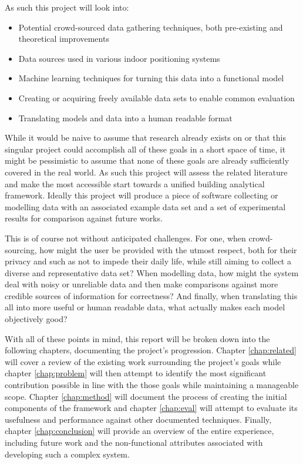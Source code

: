 \documentclass{UoYCSproject}
\begin{document}
        As such this project will look into:
        \begin{itemize}
        	\item Potential crowd-sourced data gathering techniques, both pre-existing and theoretical improvements
        	\item Data sources used in various indoor positioning systems
        	\item Machine learning techniques for turning this data into a functional model
        	\item Creating or acquiring freely available data sets to enable common evaluation
        	\item Translating models and data into a human readable format
        \end{itemize}
        
        While it would be naive to assume that research already exists on or that this singular project could accomplish all of these goals in a short space of time, it might be pessimistic to assume that none of these goals are already sufficiently covered in the real world. As such this project will assess the related literature and make the most accessible start towards a unified building analytical framework. Ideally this project will produce a piece of software collecting or modelling data with an associated example data set and a set of experimental results for comparison against future works.
        
        This is of course not without anticipated challenges. For one, when crowd-sourcing, how might the user be provided with the utmost respect, both for their privacy and such as not to impede their daily life, while still aiming to collect a diverse and representative data set? When modelling data, how might the system deal with noisy or unreliable data and then make comparisons against more credible sources of information for correctness? And finally, when translating this all into more useful or human readable data, what actually makes each model objectively good?
        
        With all of these points in mind, this report will be broken down into the following chapters, documenting the project's progression. Chapter \ref{chap:related} will cover a review of the existing work surrounding the project's goals while chapter \ref{chap:problem} will then attempt to identify the most significant contribution possible in line with the those goals while maintaining a manageable scope. Chapter \ref{chap:method} will document the process of creating the initial components of the framework and chapter \ref{chap:eval} will attempt to evaluate its usefulness and performance against other documented techniques. Finally, chapter \ref{chap:conclusion} will provide an overview of the entire experience, including future work and the non-functional attributes associated with developing such a complex system.
        
\end{document}
